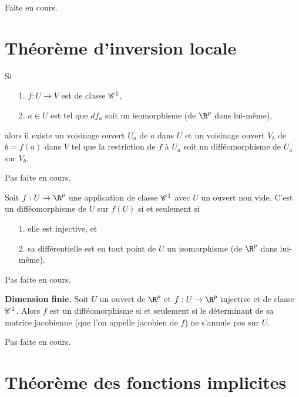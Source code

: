 \documentclass[class=report,crop=false]{standalone}
\begin{document}
 Faite en cours.

\section{Th\'eor\`eme d'inversion locale}
\begin{theoreme}
\textcolor[rgb]{0.44,0.00,0.87}{
Si
\begin{itemize}
  \item[1.]$f: U \rightarrow V$ est de classe $\mathscr{C}^1$,
  \item[2.]$a \in U$ est tel que $df_a$ soit un isomorphisme (de $\R^p$ dans lui-même),
  \end{itemize}
alors il existe un voisinage ouvert $U_a$ de $a$ dans $U$ et un voisinage ouvert
$V_b$ de $b=f(a)$ dans $V$ tel que la restriction de $f$ \`a $U_a$ soit un diff\'eomorphisme de $U_a$
sur $V_b$.}
\end{theoreme}

 Pas faite en cours.

\begin{corollaire}
 \textcolor[rgb]{0.44,0.00,0.87}{
  Soit $f: U \rightarrow \R^p$ une application de classe $\mathscr{C}^1$ avec $U$ un ouvert
non vide. C'est un diff\'eomorphisme de $U$ sur $f(U)$ si et seulement si
\begin{itemize}
  \item[1.] elle est injective, et
  \item[2.] sa diff\'erentielle est en tout point de $U$ un isomorphisme  (de $\R^p$ dans lui-même).
\end{itemize}}
\end{corollaire}

 Pas faite en cours.

\begin{corollaire} \textcolor[rgb]{0.44,0.00,0.87}{ \textbf{Dimension finie.}
  Soit $U$ un ouvert de $\R^p$ et $f: U \rightarrow \R^p$ injective et de classe $\mathscr{C}^1$.
Alors $f$ est un diff\'eomorphisme si et seulement si le d\'eterminant de sa matrice jacobienne
(que l'on appelle jacobien de $f$) ne s'annule pas sur $U$.}
\end{corollaire}

 Pas faite en cours.

\section{Th\'eor\`eme des fonctions implicites}
\end{document}
